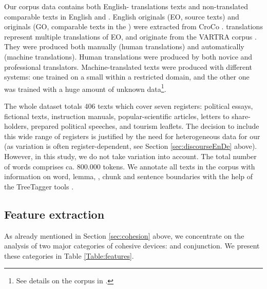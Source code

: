 \documentclass[output=paper]{langsci/langscibook.cls}
\begin{document}
Our corpus  data contains both English- translations texts and non-trans\-lat\-ed comparable texts in English and . English originals (EO, source texts) and  originals (GO, comparable texts in the ) were extracted from CroCo \citep{Croco2012}.  translations represent multiple translations of EO, and originate from the VARTRA corpus \citep{LapshinovaKoltunski:2013:BUCC}. They were produced both manually (human translations) and automatically (machine translations). Human translations were produced by both novice and professional translators. Machine-translated texts were produced with different systems: one trained on a small  within a restricted domain, and the other one was trained with a huge amount of unknown data\footnote{See details on the corpus in \citep{LapshinovaKoltunski:2013:BUCC}.}.

The whole dataset totals 406 texts which cover seven registers: political essays, fictional texts, instruction manuals, popular-scientific articles, letters to share-holders, prepared political speeches, and tourism leaflets. The decision to include this wide range of registers is justified by the need for heterogeneous data for our  (as variation is often register-dependent, see Section \ref{sec:discourseEnDe} above). However, in this study, we do not take  variation into account. The total number of words comprises ca. 800.000 tokens. We annotate all texts in the corpus with information on word, lemma, , chunk and sentence boundaries with the help of the TreeTagger tools \citep{Schmid1994}.

\subsection{Feature extraction}\label{sec:features}
As already mentioned in Section \ref{sec:cohesion} above, we concentrate on the analysis of two major categories of cohesive devices:  and conjunction. We present these categories in Table \ref{Table:features}.
\end{document}
